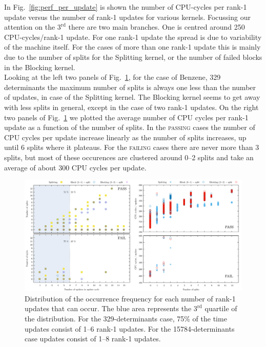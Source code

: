 \documentclass[11pt]{article}
\numberwithin{figure}{section}
\numberwithin{table}{section}
\begin{document}
    	In Fig.~\ref{fig:perf_per_update} is shown the number of CPU-cycles per rank-1 update versus the number of rank-1 updates for various kernels. Focussing our attention on the $3^\mathrm{rd}$ there are two main branches. One is centred around 250 CPU-cycles/rank-1 update. For one rank-1 update the spread is due to variability of the machine itself. For the cases of more than one rank-1 update this is mainly due to the number of splits for the Splitting kernel, or the number of failed blocks in the Blocking kernel.\\
    					
    	Looking at the left two panels of Fig.~\ref{upds_nsplits_cpucycles}, for the case of Benzene, 329 determinants the maximum number of splits is always one less than the number of updates, in case of the Splitting kernel. The Blocking kernel seems to get away with less splits in general, except in the case of two rank-1 updates. On the right two panels of Fig.~\ref{upds_nsplits_cpucycles} we plotted the average number of CPU cycles per rank-1 update as a function of the number of splits. In  the \textsc{passing} cases the number of CPU cycles per update increase linearly as the number of splits increases, up until 6 splits where it plateaus. For the \textsc{failing} cases there are never more than 3 splits, but most of these occurences are clustered around 0--2 splits and take an average of about 300 CPU cycles per update. 
    
    	\begin{figure}[h]
    		\centering
    		\includegraphics[width=1\textwidth]{upds_nsplits_cpucycles.png}
    		\caption{Distribution of the occurrence frequency for each number of rank-1 updates that can occur. The blue area represents the $3^\mathrm{rd}$ quartile of the distribution. For the 329-determinants case, 75\% of the time updates consist of 1--6 rank-1 updates. For the 15784-determinants case updates consist of 1--8 rank-1 updates.}
    		\label{upds_nsplits_cpucycles}
    	\end{figure}
						
\end{document}
